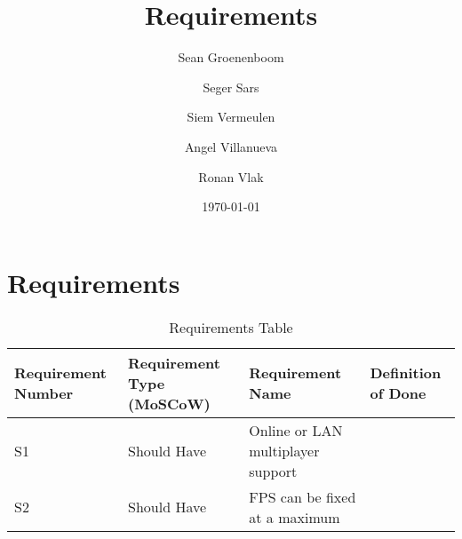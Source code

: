 \documentclass{article} %
\title{Requirements} %
\author{Sean Groenenboom \and Seger Sars \and Siem Vermeulen \and Angel Villanueva \and Ronan Vlak} %
\date{\today} %
\begin{document}
    \maketitle %
    \newpage

    \section{Requirements}
    \begin{table}[h!]
        \centering
        \begin{tabularx}{\textwidth}{|X|X|X|X|}
        \hline
        \textbf{Requirement Number} & \textbf{Requirement Type (MoSCoW)} & \textbf{Requirement Name} & \textbf{Definition of Done} \\ \hline
        S1 & Should Have & Online or LAN multiplayer support & \\ \hline
        S2 & Should Have & FPS can be fixed at a maximum & \\ \hline
        \end{tabularx}
        \caption{Requirements Table}
        \label{tab:requirements}
        \end{table}
    \newpage
\end{document}
